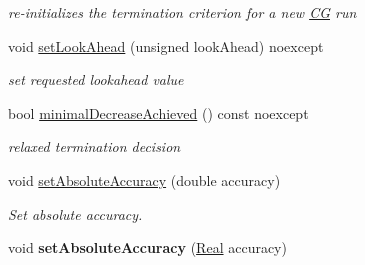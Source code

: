 \begin{DoxyCompactItemize}
\begin{DoxyCompactList}\small\item\em re-\/initializes the termination criterion for a new \hyperlink{namespaceSpacy_1_1CG}{C\+G} run \end{DoxyCompactList}\item 
void \hyperlink{classSpacy_1_1CG_1_1Termination_1_1StrakosTichyEnergyError_ac40343f544b7e2bfeffa7f7927cfeac5_ac40343f544b7e2bfeffa7f7927cfeac5}{set\+Look\+Ahead} (unsigned look\+Ahead) noexcept
\begin{DoxyCompactList}\small\item\em set requested lookahead value \end{DoxyCompactList}\item 
bool \hyperlink{classSpacy_1_1CG_1_1Termination_1_1StrakosTichyEnergyError_af13fec942d9d9ec622803e226537ffec_af13fec942d9d9ec622803e226537ffec}{minimal\+Decrease\+Achieved} () const noexcept
\begin{DoxyCompactList}\small\item\em relaxed termination decision \end{DoxyCompactList}\item 
void \hyperlink{classSpacy_1_1Mixin_1_1AbsoluteAccuracy_a71cfcdc0c504be63c18c3e78df157738_a71cfcdc0c504be63c18c3e78df157738}{set\+Absolute\+Accuracy} (double accuracy)
\begin{DoxyCompactList}\small\item\em Set absolute accuracy. \end{DoxyCompactList}\item 
\hypertarget{classSpacy_1_1Mixin_1_1AbsoluteAccuracy_ad099a4a0a770133b56acaaf8783d4ba6}{}void {\bfseries set\+Absolute\+Accuracy} (\hyperlink{classSpacy_1_1Real}{Real} accuracy)\label{classSpacy_1_1Mixin_1_1AbsoluteAccuracy_ad099a4a0a770133b56acaaf8783d4ba6}


\end{DoxyCompactItemize}
